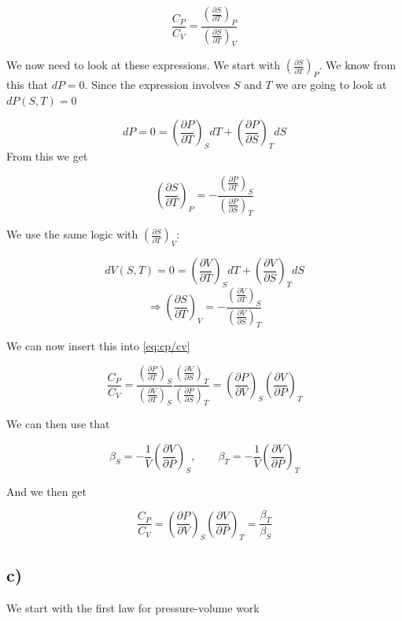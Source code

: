 \documentclass[a4paper,norsk, 10pt]{article}
\newcommand{\pd}[2]{\frac{\partial #1}{\partial #2}}
\begin{document}
\begin{equation}
\frac{C_P}{C_V} = \frac{\left(\pd{S}{T}\right)_P}{\left(\pd{S}{T}\right)_V}
\label{eq:cp/cv}
\end{equation}

We now need to look at these expressions. We start with $\left(\pd{S}{T}\right)_P$. We know from this that $dP = 0$. Since the expression involves $S$ and $T$ we are going to look at $dP(S,T) = 0$

\begin{equation}
dP = 0 = \left(\pd{P}{T}\right)_S dT + \left(\pd{P}{S}\right)_T dS
\end{equation}
From this we get

\begin{equation}
\left(\pd{S}{T}\right)_P = -\frac{\left(\pd{P}{T}\right)_S}{\left(\pd{P}{S}\right)_T}
\end{equation}

We use the same logic with $\left(\pd{S}{T}\right)_V$:

\begin{equation}
dV(S,T) = 0 = \left(\pd{V}{T}\right)_S dT + \left(\pd{V}{S}\right)_T dS
\end{equation}
\begin{equation}
\Rightarrow\left(\pd{S}{T}\right)_V = -\frac{\left(\pd{V}{T}\right)_S}{\left(\pd{V}{S}\right)_T}
\end{equation}

We can now insert this into \eqref{eq:cp/cv}

\begin{equation}
\frac{C_P}{C_V} = \frac{\left(\pd{P}{T}\right)_S}{\left(\pd{V}{T}\right)_S}\frac{\left(\pd{V}{S}\right)_T}{\left(\pd{P}{S}\right)_T} =
\left(\pd{P}{V}\right)_S \left(\pd{V}{P}\right)_T
\end{equation}

We can then use that

\begin{equation}
\beta_S = -\frac{1}{V}\left(\pd{V}{P}\right)_S, \qquad \beta_T = -\frac{1}{V}\left(\pd{V}{P}\right)_T
\end{equation}

And we then get

\begin{equation}
\frac{C_P}{C_V} = \left(\pd{P}{V}\right)_S \left(\pd{V}{P}\right)_T = \frac{\beta_T}{\beta_S}
\end{equation}

\subsection{c)}
We start with the first law for pressure-volume work
\end{document}
